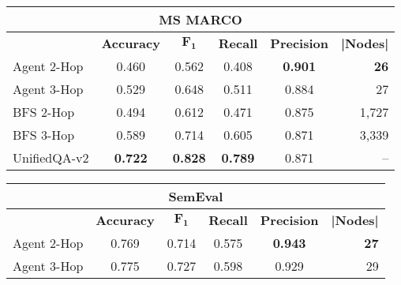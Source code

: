

\begin{center}
\footnotesize
  \renewcommand{\arraystretch}{0.95}
  \renewcommand{\tabcolsep}{6.4pt}
  \begin{tabular}{lccccr} 
    \toprule
    \multicolumn{6}{c}{\textbf{MS MARCO}}\\
    \midrule
    & \textbf{Accuracy} & \textbf{$\mathbf{F_1}$} & \textbf{Recall} & \textbf{Precision} & \textbf{|Nodes|}\\
    \midrule
    Agent 2-Hop & 0.460 & 0.562 & 0.408 & \textbf{0.901} & \textbf{26}\\
    Agent 3-Hop & 0.529 & 0.648 & 0.511 & 0.884 & 27 \\
    \midrule
    BFS 2-Hop & 0.494 & 0.612 & 0.471 & 0.875 & 1,727 \\ 
    BFS 3-Hop & 0.589 & 0.714 & 0.605 & 0.871 & 3,339\\ 
    \midrule
    UnifiedQA-v2 & \textbf{0.722} & \textbf{0.828} & \textbf{0.789} & 0.871 & -- \\
    \bottomrule
\end{tabular}
\centering
\renewcommand{\tabcolsep}{6.47pt}
\hspace{-0.20cm}
\begin{tabular}{lccccr} 
    \toprule
    \multicolumn{6}{c}{\textbf{SemEval}}\\
    \midrule
    & \textbf{Accuracy} & \textbf{$\mathbf{F_1}$} & \textbf{Recall} & \textbf{Precision} & \textbf{|Nodes|}\\
    \midrule
    Agent 2-Hop &  0.769 & 0.714 & 0.575 & \textbf{0.943} & \textbf{27}\\
    Agent 3-Hop & 0.775 & 0.727 & 0.598 & 0.929 & 29\\

\end{tabular}
\end{center}
